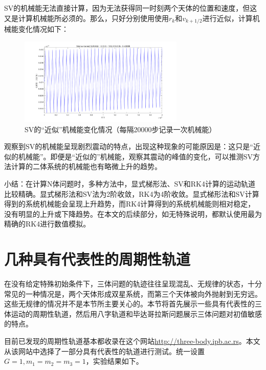 \documentclass{article}
\begin{document}
\par SV的机械能无法直接计算，因为无法获得同一时刻两个天体的位置和速度，但这又是计算机械能所必须的。那么，只好分别使用使用$r_k$和$v_{k+1/2}$进行近似，计算机械能变化情况如下：
\begin{figure}[H]
	\centering  %
	\includegraphics[width=0.7\textwidth]{二体问题-能量误差//Störmer-Verlet法的机械能（近似值）变化,时间范围：0~20000}
	\caption{SV的“近似”机械能变化情况（每隔20000步记录一次机械能）}
	\label{Two-Body-energy-SV}
\end{figure}
\par 观察到SV的机械能呈现剧烈震动的特点，出现这种现象的可能原因是：这只是“近似的机械能”。即便是“近似的”机械能，观察其震动的峰值的变化，可以推测SV方法计算的二体系统的机械能也有略微上升的趋势。
\par 
\par 小结：在计算N体问题时，多种方法中，显式梯形法、SV和RK4计算的运动轨道比较精确。显式梯形法和SV法为2阶收敛，RK4为4阶收敛。显式梯形法和SV计算得到的系统机械能会呈现上升趋势，而RK4计算得到的系统机械能则相对稳定，没有明显的上升或下降趋势。在本文的后续部分，如无特殊说明，都默认使用最为精确的RK4进行数值模拟。

\section{几种具有代表性的周期性轨道}
\par 在没有给定特殊初始条件下，三体问题的轨迹往往呈现混乱、无规律的状态，十分常见的一种情况是，两个天体形成双星系统，而第三个天体被向外抛射到无穷远。这些无规律的情况并不是本节所主要关心的。本节将首先展示一些具有代表性的三体运动的周期性轨道，然后用八字轨道和毕达哥拉斯问题展示三体问题对初值敏感的特点。

\par 目前已发现的周期性轨道基本都收录在这个网站\url{http://three-body.ipb.ac.rs}。本文从该网站中选择了一部分具有代表性的轨道进行测试。统一设置$G=1,m_1=m_2=m_3=1$，实验结果如下。
\end{document}
